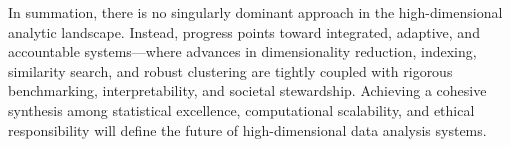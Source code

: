 \documentclass[sigconf]{acmart}
\begin{document}
In summation, there is no singularly dominant approach in the high-dimensional analytic landscape. Instead, progress points toward integrated, adaptive, and accountable systems—where advances in dimensionality reduction, indexing, similarity search, and robust clustering are tightly coupled with rigorous benchmarking, interpretability, and societal stewardship. Achieving a cohesive synthesis among statistical excellence, computational scalability, and ethical responsibility will define the future of high-dimensional data analysis systems.



\end{document}
